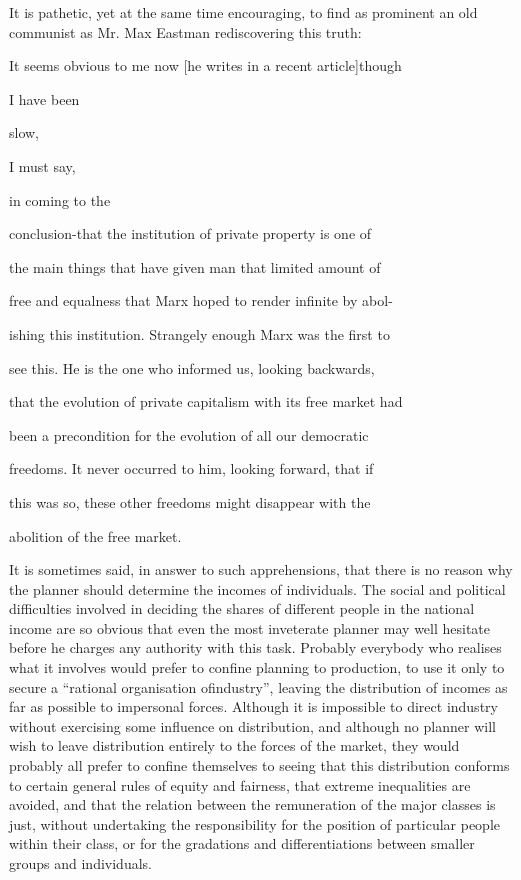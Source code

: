 \documentclass[11pt,openany]{book}
\begin{document}
It is pathetic, yet at the same time encouraging, to find as prominent an old communist as Mr. Max Eastman rediscovering this truth:

It seems obvious to me now [he writes in a recent article]though

I have been

slow,

I must say,

in coming to the

conclusion-that the institution of private property is one of

the main things that have given man that limited amount of

free and equalness that Marx hoped to render infinite by abol-

ishing this institution. Strangely enough Marx was the first to

see this. He is the one who informed us, looking backwards,

that the evolution of private capitalism with its free market had

been a precondition for the evolution of all our democratic

freedoms. It never occurred to him, looking forward, that if

this was so, these other freedoms might disappear with the

abolition of the free market.

It is sometimes said, in answer to such apprehensions, that there is no reason why the planner should determine the incomes of individuals. The social and political difficulties involved in deciding the shares of different people in the national income are so obvious that even the most inveterate planner may well hesitate before he charges any authority with this task. Probably everybody who realises what it involves would prefer to confine planning to production, to use it only to secure a ``rational organisation ofindustry'', leaving the distribution of incomes as far as possible to impersonal forces. Although it is impossible to direct industry without exercising some influence on distribution, and although no planner will wish to leave distribution entirely to the forces of the market, they would probably all prefer to confine themselves to seeing that this distribution conforms to certain general rules of equity and fairness, that extreme inequalities are avoided, and that the relation between the remuneration of the major classes is just, without undertaking the responsibility for the position of particular people within their class, or for the gradations and differentiations between smaller groups and individuals.
\end{document}
